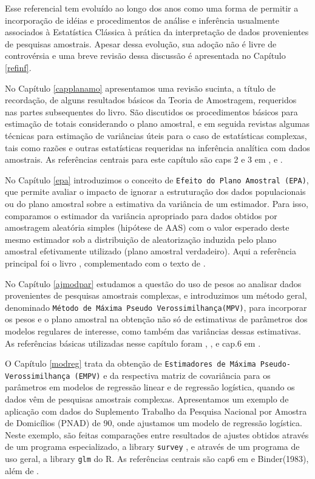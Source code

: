 \documentclass[]{book}
\theoremstyle{definition}
\theoremstyle{definition}
\theoremstyle{remark}
\begin{document}
Esse referencial tem evoluído ao longo dos anos como uma forma de
permitir a incorporação de idéias e procedimentos de análise e
inferência usualmente associados à Estatística Clássica à prática da
interpretação de dados provenientes de pesquisas amostrais. Apesar dessa
evolução, sua adoção não é livre de controvérsia e uma breve revisão
dessa discussão é apresentada no Capítulo \ref{refinf}.

No Capítulo \ref{capplanamo} apresentamos uma revisão sucinta, a título
de recordação, de alguns resultados básicos da Teoria de Amostragem,
requeridos nas partes subsequentes do livro. São discutidos os
procedimentos básicos para estimação de totais considerando o plano
amostral, e em seguida revistas algumas técnicas para estimação de
variâncias úteis para o caso de estatísticas complexas, tais como razões
e outras estatísticas requeridas na inferência analítica com dados
amostrais. As referências centrais para este capítulo são caps 2 e 3 em
\citep{SSW92}, \citep{W85} e \citep{cochran}.

No Capítulo \ref{epa} introduzimos o conceito de
\texttt{Efeito\ do\ Plano\ Amostral\ (EPA)}, que permite avaliar o
impacto de ignorar a estruturação dos dados populacionais ou do plano
amostral sobre a estimativa da variância de um estimador. Para isso,
comparamos o estimador da variância apropriado para dados obtidos por
amostragem aleatória simples (hipótese de AAS) com o valor esperado
deste mesmo estimador sob a distribuição de aleatorização induzida pelo
plano amostral efetivamente utilizado (plano amostral verdadeiro). Aqui
a referência principal foi o livro \citep{SHS89}, complementado com o
texto de \citep{lethonen}.

No Capítulo \ref{ajmodpar} estudamos a questão do uso de pesos ao
analisar dados provenientes de pesquisas amostrais complexas, e
introduzimos um método geral, denominado
\texttt{Método\ de\ Máxima\ Pseudo\ Verossimilhança(MPV)}, para
incorporar os pesos e o plano amostral na obtenção não só de estimativas
de parâmetros dos modelos regulares de interesse, como também das
variâncias dessas estimativas. As referências básicas utilizadas nesse
capítulo foram \citep{SHS89}, \citep{Pfeff}, \citep{binder83} e cap.6 em
\citep{Silva}.

O Capítulo \ref{modreg} trata da obtenção de
\texttt{Estimadores\ de\ Máxima\ Pseudo-Verossimilhança\ (EMPV)} e da
respectiva matriz de covariância para os parâmetros em modelos de
regressão linear e de regressão logística, quando os dados vêm de
pesquisas amostrais complexas. Apresentamos um exemplo de aplicação com
dados do Suplemento Trabalho da Pesquisa Nacional por Amostra de
Domicílios (PNAD) de 90, onde ajustamos um modelo de regressão
logística. Neste exemplo, são feitas comparações entre resultados de
ajustes obtidos através de um programa especializado, a library
\texttt{survey} \citep{R-survey}, e através de um programa de uso geral,
a library \texttt{glm} do R. As referências centrais são cap6 em
\citep{Silva} e Binder(1983), além de \citep{Pessoa}.
\end{document}

